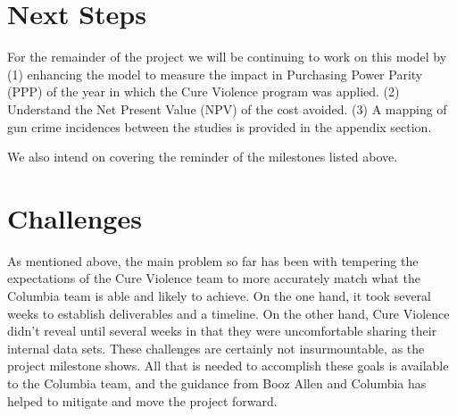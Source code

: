 \documentclass[11pt,preprint]{aastex}
\begin{document}
\section{Next Steps}
For the remainder of the project we will be continuing to work on this model by (1) enhancing the model to measure the impact in Purchasing Power Parity (PPP) of the year in which the Cure Violence program was applied.   (2) Understand the Net Present Value (NPV) of the cost avoided. (3) A mapping of gun crime incidences between the studies is provided in the appendix section.

We also intend on covering the reminder of the milestones listed above.

\section{Challenges}
As mentioned above, the main problem so far has been with tempering the expectations of the Cure Violence team to more accurately match what the Columbia team is able and likely to achieve. On the one hand, it took several weeks to establish deliverables and a timeline. On the other hand, Cure Violence didn't reveal until several weeks in that they were uncomfortable sharing their internal data sets. These challenges are certainly not insurmountable, as the project milestone shows. All that is needed to accomplish these goals is available to the Columbia team, and the guidance from Booz Allen and Columbia has helped to mitigate and move the project forward.

\newpage

\end{document}
